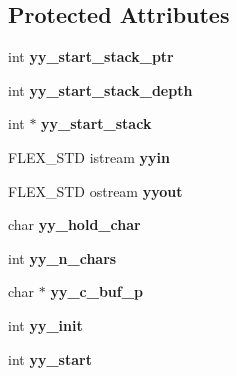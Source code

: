\subsection*{Protected Attributes}
\begin{DoxyCompactItemize}
\item 
int {\bfseries yy\+\_\+start\+\_\+stack\+\_\+ptr}\hypertarget{classyyFlexLexer_a45cf5f774631413c0d7aa820e8acb761}{}\label{classyyFlexLexer_a45cf5f774631413c0d7aa820e8acb761}

\item 
int {\bfseries yy\+\_\+start\+\_\+stack\+\_\+depth}\hypertarget{classyyFlexLexer_a23f6dda98adbcbe13cfbfd1c74efc66f}{}\label{classyyFlexLexer_a23f6dda98adbcbe13cfbfd1c74efc66f}

\item 
int $\ast$ {\bfseries yy\+\_\+start\+\_\+stack}\hypertarget{classyyFlexLexer_abbb8bfcab69577e4d708e33c4627967d}{}\label{classyyFlexLexer_abbb8bfcab69577e4d708e33c4627967d}

\item 
F\+L\+E\+X\+\_\+\+S\+TD istream {\bfseries yyin}\hypertarget{classyyFlexLexer_aa4273605f7cc73c5e4d51007cfa0555d}{}\label{classyyFlexLexer_aa4273605f7cc73c5e4d51007cfa0555d}

\item 
F\+L\+E\+X\+\_\+\+S\+TD ostream {\bfseries yyout}\hypertarget{classyyFlexLexer_a0529a92ee5e39f601655cb6b24273966}{}\label{classyyFlexLexer_a0529a92ee5e39f601655cb6b24273966}

\item 
char {\bfseries yy\+\_\+hold\+\_\+char}\hypertarget{classyyFlexLexer_a11b21266d7c772de839fe15c978e84be}{}\label{classyyFlexLexer_a11b21266d7c772de839fe15c978e84be}

\item 
int {\bfseries yy\+\_\+n\+\_\+chars}\hypertarget{classyyFlexLexer_ac2fa33e27e117953f53738b85d56353c}{}\label{classyyFlexLexer_ac2fa33e27e117953f53738b85d56353c}

\item 
char $\ast$ {\bfseries yy\+\_\+c\+\_\+buf\+\_\+p}\hypertarget{classyyFlexLexer_a117a76190eab99960a06ec667dee9abc}{}\label{classyyFlexLexer_a117a76190eab99960a06ec667dee9abc}

\item 
int {\bfseries yy\+\_\+init}\hypertarget{classyyFlexLexer_a41cf7d4197a347a025cd10e042315bc4}{}\label{classyyFlexLexer_a41cf7d4197a347a025cd10e042315bc4}

\item 
int {\bfseries yy\+\_\+start}\hypertarget{classyyFlexLexer_afcad81a77535144e11e2a897eaa724b7}{}\label{classyyFlexLexer_afcad81a77535144e11e2a897eaa724b7}


\end{DoxyCompactItemize}
